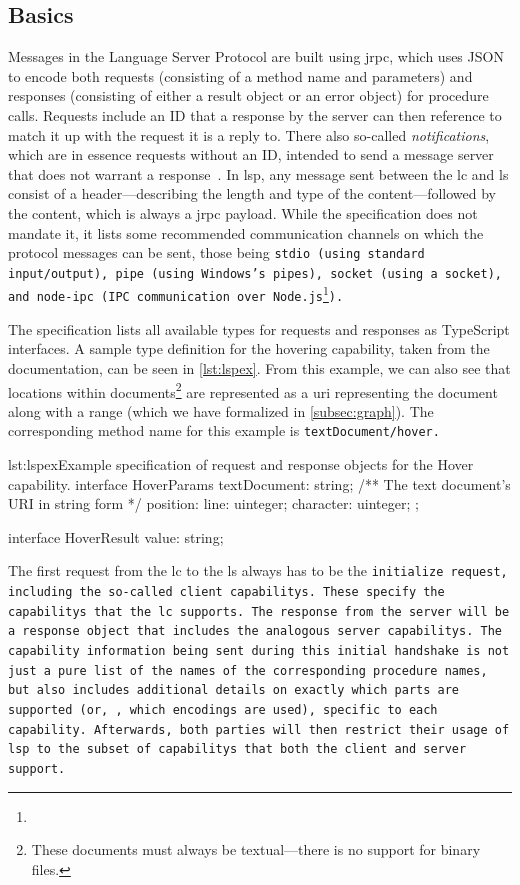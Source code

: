 \documentclass[../thesis]{subfiles}
\begin{document}
\subsection{Basics}\label{subsec:lspbasics}
Messages in the Language Server Protocol are built using \gls{jrpc}, which uses JSON to encode both requests (consisting of a method name and parameters) and responses (consisting of either a result object or an error object) for procedure calls.
Requests include an ID that a response by the server can then reference to match it up with the request it is a reply to.
There also so-called \emph{notifications}, which are in essence requests without an ID, intended to send a message server that does not warrant a response~\cite{jsonrpc,json}.
In \gls{lsp}, any message sent between the \gls{lc} and \gls{ls} consist of a header---describing the length and type of the content---followed by the content, which is always a \gls{jrpc} payload.
While the specification does not mandate it, it lists some recommended communication channels on which the protocol messages can be sent, those being \tt{stdio} (using standard input/output), \tt{pipe} (using Windows's pipes), \tt{socket} (using a socket), and \tt{node-ipc} (IPC communication over Node.js\footnote{}).

The specification lists all available types for requests and responses as TypeScript interfaces.
A sample type definition for the hovering \gls{capability}, taken from the documentation, can be seen in \cref{lst:lspex}.
From this example, we can also see that locations within documents\footnote{
  These documents must always be textual---there is no support for binary files.
} are represented as a \gls*{uri} representing the document along with a \gls{range} (which we have formalized in \cref{subsec:graph}).
The corresponding method name for this example is \tt{textDocument/hover}.

\begin{codebox}[TypeScript]{lst:lspex}{Example specification of request and response objects for the Hover {capability}.}
  interface HoverParams {
    textDocument: string; /** The text document's URI in string form */
    position: { line: uinteger; character: uinteger; };
  }

	interface HoverResult {
    value: string;
  }
\end{codebox}\label{lst:lspex}

The first request from the \gls{lc} to the \gls{ls} always has to be the \tt{initialize} request, including the so-called client \glspl{capability}.
These specify the \glspl{capability} that the \gls{lc} supports.
The response from the server will be a response object that includes the analogous server \glspl{capability}.
The \gls{capability} information being sent during this initial handshake is not just a pure list of the names of the corresponding procedure names, but also includes additional details on exactly which parts are supported (or, \eg, which encodings are used), specific to each \gls{capability}.
Afterwards, both parties will then restrict their usage of \gls{lsp} to the subset of \glspl{capability} that both the client and server support.
\end{document}
